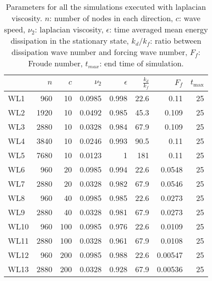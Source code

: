 \begin{table}
\begin{center}

\label{Table2}

\begin{tabular}{lrrrrrrr}
\toprule
{} &  $n$ &  $c$ &  $\nu_2$ &  $\epsilon$ &  $\frac{k_d}{k_f}$ &   $F_f$ &  $t_{\max}$ \\
\midrule
WL1  &  960 &   10 &   0.0985 &       0.998 &                    22.6 &    0.11 &          25 \\
WL2  & 1920 &   10 &   0.0492 &       0.985 &                    45.3 &   0.109 &          25 \\
WL3  & 2880 &   10 &   0.0328 &       0.984 &                    67.9 &   0.109 &          25 \\
WL4  & 3840 &   10 &   0.0246 &       0.993 &                    90.5 &    0.11 &          25 \\
WL5  & 7680 &   10 &   0.0123 &           1 &                     181 &    0.11 &          25 \\
WL6  &  960 &   20 &   0.0985 &       0.994 &                    22.6 &  0.0548 &          25 \\
WL7  & 2880 &   20 &   0.0328 &       0.982 &                    67.9 &  0.0546 &          25 \\
WL8  &  960 &   40 &   0.0985 &       0.985 &                    22.6 &  0.0273 &          25 \\
WL9  & 2880 &   40 &   0.0328 &       0.981 &                    67.9 &  0.0273 &          25 \\
WL10 &  960 &  100 &   0.0985 &       0.976 &                    22.6 &  0.0109 &          25 \\
WL11 & 2880 &  100 &   0.0328 &       0.961 &                    67.9 &  0.0108 &          25 \\
WL12 &  960 &  200 &   0.0985 &       0.988 &                    22.6 & 0.00547 &          25 \\
WL13 & 2880 &  200 &   0.0328 &       0.928 &                    67.9 & 0.00536 &          25 \\
\bottomrule
\end{tabular}
\caption{Parameters for all the simulations executed with laplacian viscosity.
$ n $: number of nodes in each direction, $ c $: wave speed, $ \nu_2 $: laplacian viscosity, $ \epsilon $: time
averaged mean energy dissipation in the stationary state, $ k_{d}/ k_f $: ratio
between dissipation wave number and forcing wave number, $ F_f $: Froude
number, $ t_{max} $: end time of simulation.}
\end{center}
\end{table}
